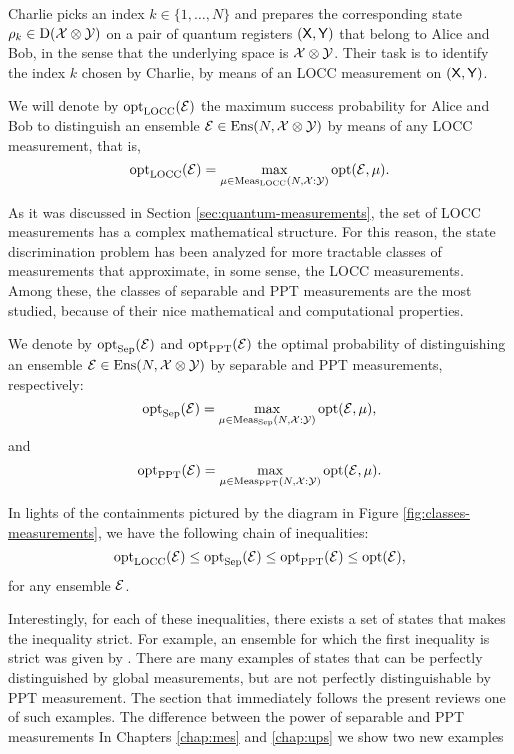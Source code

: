 Charlie picks an index $k \in \{1, \ldots, N\}$ and prepares the corresponding 
state $\rho_{k} \in \mathrm{D}(\mathcal{X}\otimes\mathcal{Y})$ on a pair of quantum registers 
$(\mathsf{X},\mathsf{Y})$ that belong to Alice and Bob, in the sense that the 
underlying space is $\mathcal{X}\otimes\mathcal{Y}$.
Their task is to identify the index $k$ chosen by Charlie, by means of an LOCC 
measurement on $(\mathsf{X},\mathsf{Y})$.

We will denote by $\operatorname{opt}_{\mathrm{LOCC}}(\mathcal{E})$ the maximum success probability for
Alice and Bob to distinguish an ensemble $\mathcal{E}\in\mathrm{Ens}(N, \mathcal{X}\otimes\mathcal{Y})$ by means of 
any LOCC measurement, that is, 
\begin{equation}
\label{eq:opt-LOCC}
  \operatorname{opt}_{\mathrm{LOCC}}(\mathcal{E}) = \max_{\mu \in \mathrm{Meas}_{\mathrm{LOCC}}(N, \mathcal{X}:\mathcal{Y})}\operatorname{opt}(\mathcal{E}, \mu).
\end{equation}

As it was discussed in Section \ref{sec:quantum-measurements}, the set of 
LOCC measurements has a complex mathematical structure.
For this reason, the state discrimination problem has been analyzed for more 
tractable classes of measurements that approximate, in some sense, 
the LOCC measurements.
Among these, the classes of separable and PPT measurements are the most studied,
because of their nice mathematical and computational properties.

We denote by $\operatorname{opt}_{\mathrm{Sep}}(\mathcal{E})$ and $\operatorname{opt}_{\mathrm{PPT}}(\mathcal{E})$ the optimal probability of
distinguishing an ensemble 
$
  \mathcal{E} \in \mathrm{Ens}(N, \mathcal{X}\otimes\mathcal{Y})
$ 
by separable and PPT measurements, respectively:
\begin{equation}
\label{eq:opt-Sep}
  \operatorname{opt}_{\mathrm{Sep}}(\mathcal{E}) = \max_{\mu \in \mathrm{Meas}_{\mathrm{Sep}}(N, \mathcal{X}:\mathcal{Y})}\operatorname{opt}(\mathcal{E}, \mu),
\end{equation}
and
\begin{equation}
\label{eq:opt-PPT}
  \operatorname{opt}_{\mathrm{PPT}}(\mathcal{E}) = \max_{\mu \in \mathrm{Meas}_{\mathrm{PPT}}(N, \mathcal{X}:\mathcal{Y})}\operatorname{opt}(\mathcal{E}, \mu).
\end{equation}


In lights of the containments pictured by the diagram in Figure \ref{fig:classes-measurements},
we have the following chain of inequalities:  
\begin{equation}
\label{eq:inequality-chain}
  \operatorname{opt}_{\mathrm{LOCC}}(\mathcal{E}) \leq \operatorname{opt}_{\mathrm{Sep}}(\mathcal{E}) \leq \operatorname{opt}_{\mathrm{PPT}}(\mathcal{E}) \leq \operatorname{opt}(\mathcal{E}),
\end{equation}
for any ensemble $\mathcal{E}$.

Interestingly, for each of these inequalities, there exists a set of states 
that makes the inequality strict. For example, an ensemble for which the first 
inequality is strict was given by \cite{Bennett99}.
There are many examples of states that can be perfectly distinguished by 
global measurements, but are not perfectly distinguishable by PPT measurement.
The section that immediately follows the present reviews one of such examples.
The difference between the power of separable and PPT measurements 
In Chapters \ref{chap:mes} and \ref{chap:ups} we show two new examples  

